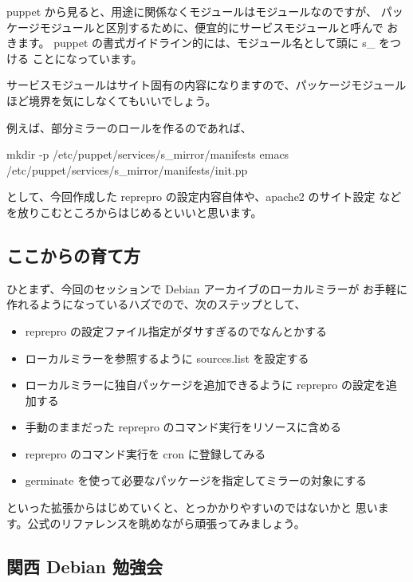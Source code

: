 \documentclass[mingoth,a4paper]{jsarticle}
\begin{document}
puppet から見ると、用途に関係なくモジュールはモジュールなのですが、
パッケージモジュールと区別するために、便宜的にサービスモジュールと呼んで
おきます。
puppet の書式ガイドライン的には、モジュール名として頭に s\_ をつける
ことになっています。

サービスモジュールはサイト固有の内容になりますので、パッケージモジュール
ほど境界を気にしなくてもいいでしょう。

例えば、部分ミラーのロールを作るのであれば、

\begin{commandline}
mkdir -p /etc/puppet/services/s_mirror/manifests
emacs /etc/puppet/services/s_mirror/manifests/init.pp
\end{commandline}

として、今回作成した reprepro の設定内容自体や、apache2 のサイト設定
などを放りこむところからはじめるといいと思います。

\subsection{ここからの育て方}

ひとまず、今回のセッションで Debian アーカイブのローカルミラーが
お手軽に作れるようになっているハズでので、次のステップとして、

\begin{itemize}
\item reprepro の設定ファイル指定がダサすぎるのでなんとかする
\item ローカルミラーを参照するように sources.list を設定する
\item ローカルミラーに独自パッケージを追加できるように reprepro の設定を追加する
\item 手動のままだった reprepro のコマンド実行をリソースに含める
\item reprepro のコマンド実行を cron に登録してみる
\item germinate を使って必要なパッケージを指定してミラーの対象にする
\end{itemize}

といった拡張からはじめていくと、とっかかりやすいのではないかと
思います。公式のリファレンスを眺めながら頑張ってみましょう。


\subsection{関西 Debian 勉強会}
\end{document}

